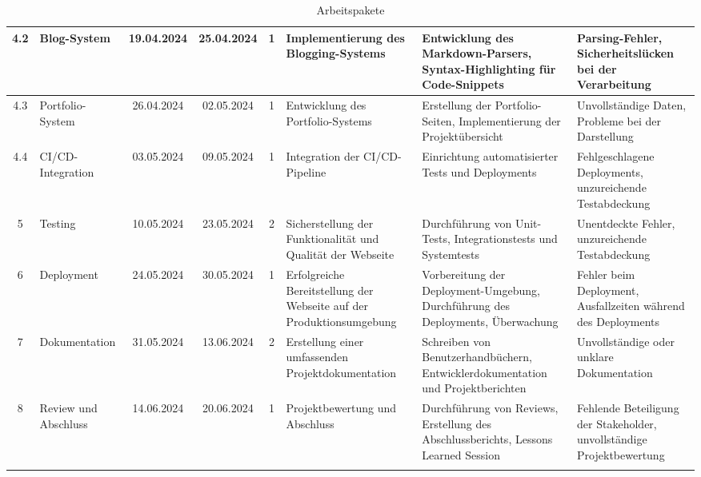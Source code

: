 \begin{landscape}
\begin{longtable}{|c|l|c|c|c|p{3cm}|p{3cm}|p{3cm}|}
        4.2 & Blog-System                 & 19.04.2024  & 25.04.2024  & 1              & Implementierung des Blogging-Systems                                  & Entwicklung des Markdown-Parsers, Syntax-Highlighting für Code-Snippets              & Parsing-Fehler, Sicherheitslücken bei der Verarbeitung               \\ \hline
        4.3 & Portfolio-System            & 26.04.2024  & 02.05.2024  & 1              & Entwicklung des Portfolio-Systems                                      & Erstellung der Portfolio-Seiten, Implementierung der Projektübersicht                  & Unvollständige Daten, Probleme bei der Darstellung                   \\ \hline
        4.4 & CI/CD-Integration           & 03.05.2024  & 09.05.2024  & 1              & Integration der CI/CD-Pipeline                                         & Einrichtung automatisierter Tests und Deployments                                  & Fehlgeschlagene Deployments, unzureichende Testabdeckung             \\ \hline
        5  & Testing                      & 10.05.2024  & 23.05.2024  & 2              & Sicherstellung der Funktionalität und Qualität der Webseite            & Durchführung von Unit-Tests, Integrationstests und Systemtests                      & Unentdeckte Fehler, unzureichende Testabdeckung                       \\ \hline
        6  & Deployment                   & 24.05.2024  & 30.05.2024  & 1              & Erfolgreiche Bereitstellung der Webseite auf der Produktionsumgebung    & Vorbereitung der Deployment-Umgebung, Durchführung des Deployments, Überwachung     & Fehler beim Deployment, Ausfallzeiten während des Deployments        \\ \hline
        7  & Dokumentation                & 31.05.2024  & 13.06.2024  & 2              & Erstellung einer umfassenden Projektdokumentation                      & Schreiben von Benutzerhandbüchern, Entwicklerdokumentation und Projektberichten     & Unvollständige oder unklare Dokumentation                            \\ \hline
        8  & Review und Abschluss         & 14.06.2024  & 20.06.2024  & 1              & Projektbewertung und Abschluss                                         & Durchführung von Reviews, Erstellung des Abschlussberichts, Lessons Learned Session & Fehlende Beteiligung der Stakeholder, unvollständige Projektbewertung \\ \hline
        \caption{Arbeitspakete}
        \label{table:arbeitspakete}
    \end{longtable} 
\end{landscape}
    

